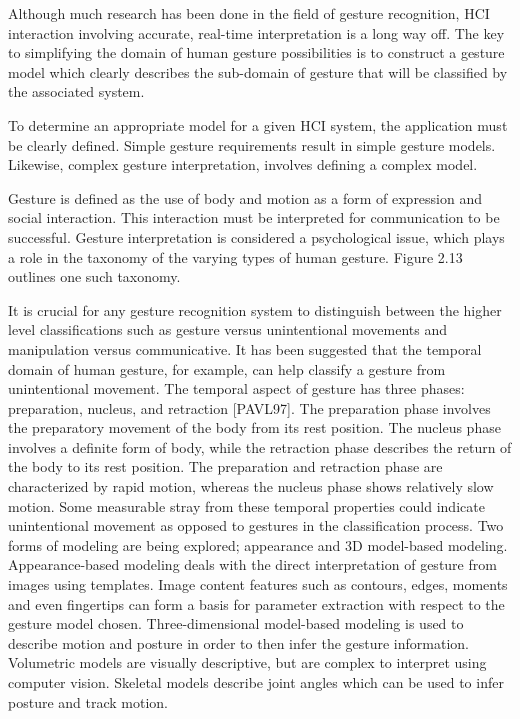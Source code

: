 Although much research has been done in the field of gesture recognition, HCI interaction involving accurate, real-time interpretation is a long way off. The key to simplifying the domain of human gesture possibilities is to construct a gesture model which clearly describes the sub-domain of gesture that will be classified by the associated system.



To determine an appropriate model for a given HCI system, the application must be clearly defined. Simple gesture requirements result in simple gesture models. Likewise, complex gesture interpretation, involves defining a complex model.

Gesture is defined as the use of body and motion as a form of expression and social interaction. This interaction must be interpreted for communication to be successful. Gesture interpretation is considered a psychological issue, which plays a role in the taxonomy of the varying types of human gesture. Figure 2.13 outlines one such taxonomy.

It is crucial for any gesture recognition system to distinguish between the higher level classifications such as gesture versus unintentional movements and manipulation versus communicative. It has been suggested that the temporal domain of human gesture, for example, can help classify a gesture from unintentional movement. The temporal aspect of gesture has three phases: preparation, nucleus, and retraction [PAVL97]. The preparation phase involves the preparatory movement of the body from its rest position. The nucleus phase involves a definite form of body, while the retraction phase describes the return of the body to its rest position. The preparation and retraction phase are characterized by rapid motion, whereas the nucleus phase shows relatively slow motion. Some measurable stray from these temporal properties could indicate unintentional movement as opposed to gestures in the classification process. Two forms of modeling are being explored; appearance and 3D model-based modeling. Appearance-based modeling deals with the direct interpretation of gesture from images using templates. Image content features such as contours, edges, moments and even fingertips can form a basis for parameter extraction with respect to the gesture model chosen. Three-dimensional model-based modeling is used to describe motion and posture in order to then infer the gesture information. Volumetric models are visually descriptive, but are complex to interpret using computer vision. Skeletal models describe joint angles which can be used to infer posture and track motion.


